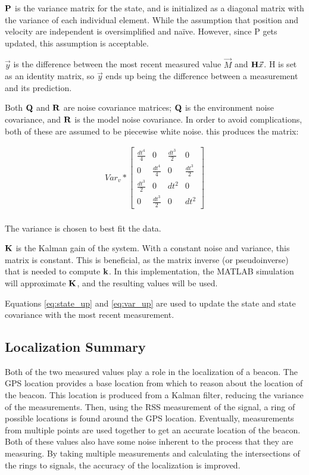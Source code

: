 $\mathbf{P}$ is the variance matrix for the state, and is initialized as a diagonal matrix with the variance of each individual element. While the assumption that position and velocity are independent is oversimplified and na{\"i}ve. However, since P gets updated, this assumption is acceptable. \par
$\vec{y}$ is the difference between the most recent measured value $\vec{M}$ and $\mathbf{H}\vec{x}$. H is set as an identity matrix, so $\vec{y}$ ends up being the difference between a measurement and its prediction. \par
Both $\mathbf{Q}$ and $\mathbf{R}$ are noise covariance matrices; $\mathbf{Q}$ is the environment noise covariance, and $\mathbf{R}$ is the model noise covariance. In order to avoid complications, both of these are assumed to be piecewise white noise. this produces the matrix: 

\begin{align}
Var_v * \begin{bmatrix}\frac{dt^4}{4} & 0 & \frac{dt^3}{2} & 0\\0 & \frac{dt^4}{4} & 0 & \frac{dt^3}{2}\\\frac{dt^3}{2} & 0 & dt^2 & 0 \\ 0 & \frac{dt^3}{2} & 0 & dt^2  \end{bmatrix}
\end{align} \\
The variance is chosen to best fit the data. \par
$\mathbf{K}$ is the Kalman gain of the system. With a constant noise and variance, this matrix is constant. This is beneficial, as the matrix inverse (or pseudoinverse) that is needed to compute $\mathbf{k}$. In this implementation, the MATLAB simulation will approximate $\mathbf{K}$, and the resulting values will be used. \par
Equations \ref{eq:state_up} and \ref{eq:var_up} are used to update the state and state covariance with the most recent measurement.

\subsection{Localization Summary}
Both of the two measured values play a role in the localization of a beacon. The GPS location provides a base location from which to reason about the location of the beacon. This location is produced from a Kalman filter, reducing the variance of the measurements. Then, using the RSS measurement of the signal, a ring of possible locations is found around the GPS location. Eventually, measurements from multiple points are used together to get an accurate location of the beacon. Both of these values also have some noise inherent to the process that they are measuring. By taking multiple measurements and calculating the intersections of the rings to signals, the accuracy of the localization is improved.


